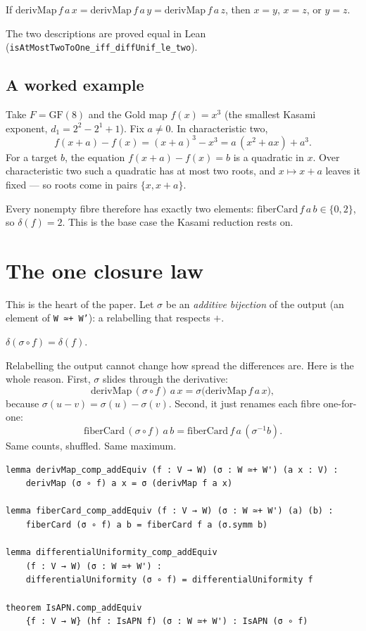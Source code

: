 \documentclass[11pt]{article}
\begin{document}
\begin{theorem}
If $\mathrm{derivMap}\, f\, a\, x = \mathrm{derivMap}\, f\, a\, y
= \mathrm{derivMap}\, f\, a\, z$, then $x=y$, $x=z$, or $y=z$.
\end{theorem}

\noindent
The two descriptions are proved equal in Lean
(\texttt{isAtMostTwoToOne\_iff\_diffUnif\_le\_two}).

\subsection{A worked example}

Take $F=\mathrm{GF}(8)$ and the Gold map $f(x)=x^{3}$ (the smallest
Kasami exponent, $d_1=2^2-2^1+1$). Fix $a\neq 0$. In characteristic two,
\[
  f(x+a)-f(x) = (x+a)^3 - x^3 = a\,(x^2 + a x) + a^3 .
\]
For a target $b$, the equation $f(x+a)-f(x)=b$ is a quadratic in $x$.
Over characteristic two such a quadratic has at most two roots, and
$x\mapsto x+a$ leaves it fixed --- so roots come in pairs $\{x,x+a\}$.

Every nonempty fibre therefore has exactly two elements:
$\mathrm{fiberCard}\,f\,a\,b \in\{0,2\}$, so $\delta(f)=2$. This is the
base case the Kasami reduction rests on.

\section{The one closure law}

This is the heart of the paper. Let $\sigma$ be an \emph{additive
bijection} of the output (an element of \texttt{W ≃+ W'}): a relabelling
that respects $+$.

\begin{theorem}
$\delta(\sigma \circ f) = \delta(f).$
\end{theorem}

\noindent
Relabelling the output cannot change how spread the differences are.
Here is the whole reason. First, $\sigma$ slides through the derivative:
\[
  \mathrm{derivMap}\,(\sigma \circ f)\, a\, x
  = \sigma\big(\mathrm{derivMap}\, f\, a\, x\big),
\]
because $\sigma(u-v)=\sigma(u)-\sigma(v)$. Second, it just renames each
fibre one-for-one:
\[
  \mathrm{fiberCard}\,(\sigma \circ f)\, a\, b
  = \mathrm{fiberCard}\, f\, a\, (\sigma^{-1} b).
\]
Same counts, shuffled. Same maximum.

\begin{lstlisting}
lemma derivMap_comp_addEquiv (f : V → W) (σ : W ≃+ W') (a x : V) :
    derivMap (σ ∘ f) a x = σ (derivMap f a x)

lemma fiberCard_comp_addEquiv (f : V → W) (σ : W ≃+ W') (a) (b) :
    fiberCard (σ ∘ f) a b = fiberCard f a (σ.symm b)

lemma differentialUniformity_comp_addEquiv
    (f : V → W) (σ : W ≃+ W') :
    differentialUniformity (σ ∘ f) = differentialUniformity f

theorem IsAPN.comp_addEquiv
    {f : V → W} (hf : IsAPN f) (σ : W ≃+ W') : IsAPN (σ ∘ f)
\end{lstlisting}
\end{document}
